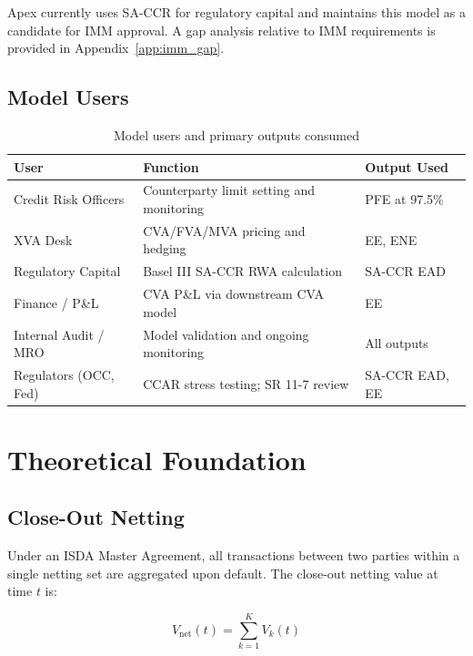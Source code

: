 \documentclass[11pt,a4paper]{article}
\begin{document}
Apex currently uses SA-CCR for regulatory capital and maintains this model as
a candidate for IMM approval. A gap analysis relative to IMM requirements is
provided in Appendix~\ref{app:imm_gap}.

\subsection{Model Users}

\begin{table}[h!]
\centering
\begin{tabular}{@{}lll@{}}
\toprule
\textbf{User} & \textbf{Function} & \textbf{Output Used} \\
\midrule
Credit Risk Officers   & Counterparty limit setting and monitoring & PFE at 97.5\% \\
XVA Desk               & CVA/FVA/MVA pricing and hedging           & EE, ENE \\
Regulatory Capital     & Basel III SA-CCR RWA calculation          & SA-CCR EAD \\
Finance / P\&L         & CVA P\&L via downstream CVA model         & EE \\
Internal Audit / MRO   & Model validation and ongoing monitoring   & All outputs \\
Regulators (OCC, Fed)  & CCAR stress testing; SR 11-7 review       & SA-CCR EAD, EE \\
\bottomrule
\end{tabular}
\caption{Model users and primary outputs consumed}
\end{table}

\section{Theoretical Foundation}
\label{sec:theory}

\subsection{Close-Out Netting}

Under an ISDA Master Agreement, all transactions between two parties within a
single netting set are aggregated upon default. The close-out netting value at
time $t$ is:

\begin{equation}
  V_{\text{net}}(t) = \sum_{k=1}^{K} V_k(t)
  \label{eq:netting}
\end{equation}
\end{document}
